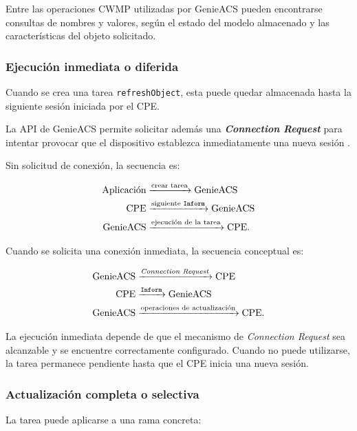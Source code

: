 Entre las operaciones CWMP utilizadas por GenieACS pueden encontrarse
consultas de nombres y valores, según el estado del modelo almacenado y
las características del objeto solicitado.


\subsubsection*{Ejecución inmediata o diferida}

Cuando se crea una tarea \texttt{refreshObject}, esta puede quedar
almacenada hasta la siguiente sesión iniciada por el CPE.

La API de GenieACS permite solicitar además una
\textbf{\textit{Connection Request}} para intentar provocar que el
dispositivo establezca inmediatamente una nueva sesión
\cite{genieacs_api}.

Sin solicitud de conexión, la secuencia es:

\[
\begin{aligned}
    \text{Aplicación}
    &\xrightarrow{\text{crear tarea}}
    \text{GenieACS}\\
    \text{CPE}
    &\xrightarrow{\text{siguiente \texttt{Inform}}}
    \text{GenieACS}\\
    \text{GenieACS}
    &\xrightarrow{\text{ejecución de la tarea}}
    \text{CPE}.
\end{aligned}
\]

Cuando se solicita una conexión inmediata, la secuencia conceptual es:

\[
\begin{aligned}
    \text{GenieACS}
    &\xrightarrow{\text{\textit{Connection Request}}}
    \text{CPE}\\
    \text{CPE}
    &\xrightarrow{\texttt{Inform}}
    \text{GenieACS}\\
    \text{GenieACS}
    &\xrightarrow{\text{operaciones de actualización}}
    \text{CPE}.
\end{aligned}
\]

La ejecución inmediata depende de que el mecanismo de
\textit{Connection Request} sea alcanzable y se encuentre correctamente
configurado. Cuando no puede utilizarse, la tarea permanece pendiente
hasta que el CPE inicia una nueva sesión.


\subsubsection*{Actualización completa o selectiva}

La tarea puede aplicarse a una rama concreta:


